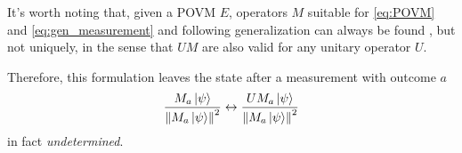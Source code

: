 \citereset
It's worth noting that,
given a POVM $E$, operators $M$
suitable for \eqref{eq:POVM} and \eqref{eq:gen_measurement}
and following generalization
can always be found \parencite[sec.3.1]{PreskillNotes},
but not uniquely, in the sense that
$UM$ are also valid
for any unitary operator $U$.

Therefore, this formulation leaves the state after a measurement
with outcome $a$
\[
  \frac{M_a\ket{\psi}}{\norm{M_a\ket{\psi}}^2}
  \leftrightarrow
  \frac{UM_a\ket{\psi}}{\norm{M_a\ket{\psi}}^2}
\]
in fact \emph{undetermined}.
